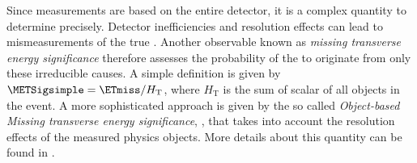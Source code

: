 Since \ETmiss measurements are based on the entire detector, it is a complex quantity to determine precisely. Detector inefficiencies and resolution effects can lead to mismeasurements of the true \ETmiss.
Another observable known as \emph{missing transverse energy significance} therefore assesses the probability of the \ETmiss to originate from only these irreducible causes.
A simple definition is given by $\METSigsimple = \ETmiss / H_{\text{T}}$, where $H_{\text{T}}$ is the sum of scalar \pT of all objects in the event.
A more sophisticated approach is given by the so called \emph{Object-based Missing transverse energy significance}, \METSigobject, that takes into account the resolution effects of the measured physics objects.
More details about this quantity can be found in .





